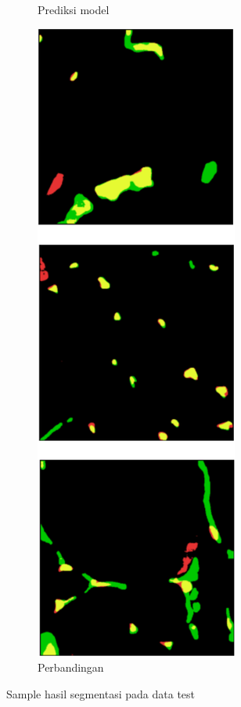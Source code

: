 \begin{figure}[H]
\begin{subfigure}[b]{0.24\textwidth}
		\caption{Prediksi model}
		\label{fig:predicted_label}
	\end{subfigure}
	\hfill
	\begin{subfigure}[b]{0.24\textwidth}
		\centering
		\includegraphics[width=\textwidth]{gambar/bab4/overlayed_label.png}
		\caption{Perbandingan}
		\label{fig:overlayed-label}
	\end{subfigure}
	
	\caption{Sample hasil segmentasi pada data test }
	\label{fig:sample_hasil}
	
\end{figure}

